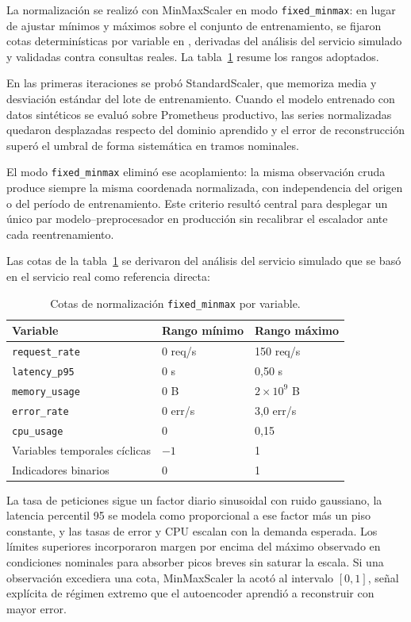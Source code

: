 La normalización se realizó con MinMaxScaler en modo \texttt{fixed\_minmax}: en lugar de ajustar mínimos y máximos sobre el conjunto de entrenamiento, se fijaron cotas determinísticas por variable en , derivadas del análisis del servicio simulado y validadas contra consultas reales. La tabla~\ref{tab:fixed-bounds} resume los rangos adoptados.

En las primeras iteraciones se probó StandardScaler, que memoriza media y desviación estándar del lote de entrenamiento. Cuando el modelo entrenado con datos sintéticos se evaluó sobre Prometheus productivo, las series normalizadas quedaron desplazadas respecto del dominio aprendido y el error de reconstrucción superó el umbral de forma sistemática en tramos nominales.

El modo \texttt{fixed\_minmax} eliminó ese acoplamiento: la misma observación cruda produce siempre la misma coordenada normalizada, con independencia del origen o del período de entrenamiento. Este criterio resultó central para desplegar un único par modelo--preprocesador en producción sin recalibrar el escalador ante cada reentrenamiento.

Las cotas de la tabla~\ref{tab:fixed-bounds} se derivaron del análisis del servicio simulado que se basó en el servicio real como referencia directa:

\begin{table}[h]
\centering
\footnotesize
\caption{Cotas de normalización \texttt{fixed\_minmax} por variable.}
\label{tab:fixed-bounds}
\begin{tabular}{@{}p{}p{}p{}@{}}
\toprule
\textbf{Variable} & \textbf{Rango mínimo} & \textbf{Rango máximo} \\
\midrule
\texttt{request\_rate} & 0 req/s & 150 req/s \\
\texttt{latency\_p95} & 0 s & 0,50 s \\
\texttt{memory\_usage} & 0 B & $2 \times 10^9$ B \\
\texttt{error\_rate} & 0 err/s & 3,0 err/s \\
\texttt{cpu\_usage} & 0 & 0,15 \\
Variables temporales cíclicas & $-1$ & 1 \\
Indicadores binarios & 0 & 1 \\
\bottomrule
\end{tabular}
\end{table}

La tasa de peticiones sigue un factor diario sinusoidal con ruido gaussiano, la latencia percentil 95 se modela como proporcional a ese factor más un piso constante, y las tasas de error y CPU escalan con la demanda esperada. Los límites superiores incorporaron margen por encima del máximo observado en condiciones nominales para absorber picos breves sin saturar la escala. Si una observación excediera una cota, MinMaxScaler la acotó al intervalo $[0,1]$, señal explícita de régimen extremo que el autoencoder aprendió a reconstruir con mayor error.


